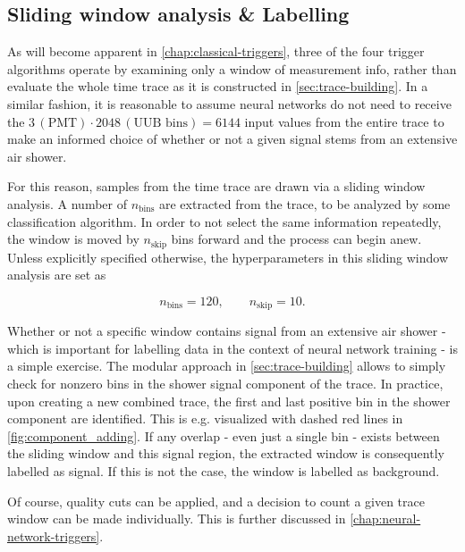 \subsection{Sliding window analysis \& Labelling}
\label{ssec:sliding-window-analysis}

As will become apparent in \autoref{chap:classical-triggers}, three of the four trigger algorithms operate by examining only a window of measurement info, rather
than evaluate the whole time trace as it is constructed in \autoref{sec:trace-building}. In a similar fashion, it is reasonable to assume neural networks do not 
need to receive the $3\,(\text{PMT})\cdot2048\,(\text{UUB bins}) = 6144$ input values from the entire trace to make an informed choice of whether or not a given
signal stems from an extensive air shower.

For this reason, samples from the time trace are drawn via a sliding window analysis. A number of $n_\text{bins}$ are extracted from the trace, to be analyzed 
by some classification algorithm. In order to not select the same information repeatedly, the window is moved by $n_\text{skip}$ bins forward and the process
can begin anew. Unless explicitly specified otherwise, the hyperparameters in this sliding window analysis are set as 

\begin{equation}
	\label{eq:sliding-window-analysis-hyperparameters}
	n_\text{bins} = 120, \qquad n_\text{skip} = 10.
\end{equation}

Whether or not a specific window contains signal from an extensive air shower - which is important for labelling data in the context of neural network training -
is a simple exercise. The modular approach in \autoref{sec:trace-building} allows to simply check for nonzero bins in the shower signal component of the trace.
In practice, upon creating a new combined trace, the first and last positive bin in the shower component are identified. This is e.g. visualized with dashed red 
lines in \autoref{fig:component_adding}. If any overlap - even just a single bin - exists between the sliding window and this signal region, the extracted window
is consequently labelled as signal. If this is not the case, the window is labelled as background.

Of course, quality cuts can be applied, and a decision to count a given trace window can be made individually. This is further discussed in 
\autoref{chap:neural-network-triggers}.
